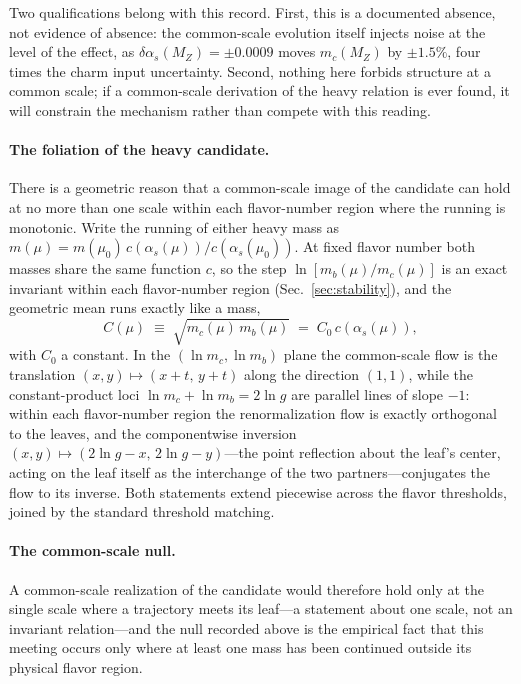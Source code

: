 \documentclass[aps,twocolumn,superscriptaddress,nofootinbib,floatfix]{revtex4-2}
\begin{document}
Two qualifications belong with this record. First, this is a documented absence, not evidence of absence: the common-scale evolution itself injects noise at the level of the effect, as $\delta\alpha_s(M_Z)=\pm0.0009$ moves $m_c(M_Z)$ by $\pm1.5\%$, four times the charm input uncertainty. Second, nothing here forbids structure at a common scale; if a common-scale derivation of the heavy relation is ever found, it will constrain the mechanism rather than compete with this reading.

\paragraph{The foliation of the heavy candidate.}
There is a geometric reason that a common-scale image of the candidate can hold at no more than one scale within each flavor-number region where the running is monotonic. Write the running of either heavy mass as $m(\mu)=m(\mu_0)\,c(\alpha_s(\mu))/c(\alpha_s(\mu_0))$. At fixed flavor number both masses share the same function $c$, so the step $\ln[m_b(\mu)/m_c(\mu)]$ is an exact invariant within each flavor-number region (Sec.~\ref{sec:stability}), and the geometric mean runs exactly like a mass,
\begin{equation}
C(\mu)\;\equiv\;\sqrt{m_c(\mu)\,m_b(\mu)}\;=\;C_0\,c\!\left(\alpha_s(\mu)\right),
\label{eq:foliation}
\end{equation}
with $C_0$ a constant. In the $(\ln m_c,\ln m_b)$ plane the common-scale flow is the translation $(x,y)\mapsto(x+t,\,y+t)$ along the direction $(1,1)$, while the constant-product loci $\ln m_c+\ln m_b=2\ln g$ are parallel lines of slope $-1$: within each flavor-number region the renormalization flow is exactly orthogonal to the leaves, and the componentwise inversion $(x,y)\mapsto(2\ln g-x,\,2\ln g-y)$---the point reflection about the leaf's center, acting on the leaf itself as the interchange of the two partners---conjugates the flow to its inverse. Both statements extend piecewise across the flavor thresholds, joined by the standard threshold matching.

\paragraph{The common-scale null.}
A common-scale realization of the candidate would therefore hold only at the single scale where a trajectory meets its leaf---a statement about one scale, not an invariant relation---and the null recorded above is the empirical fact that this meeting occurs only where at least one mass has been continued outside its physical flavor region.
\end{document}
